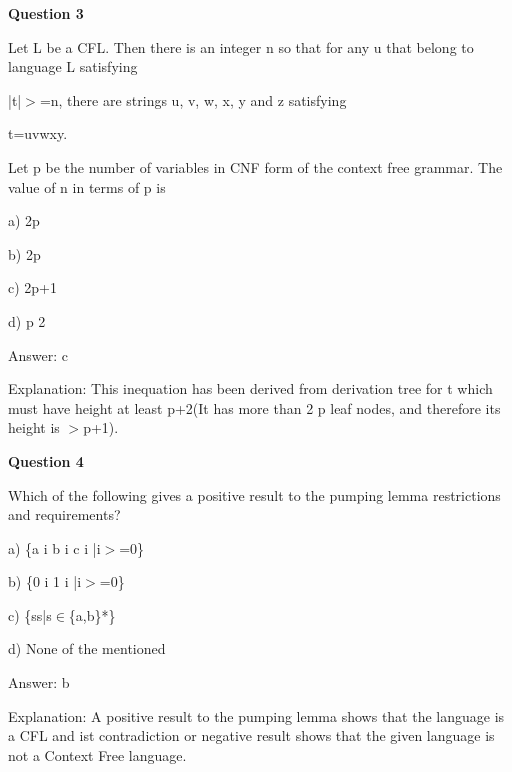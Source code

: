 \documentclass{article}
\begin{document}
\begin{mdframed}[linewidth=1pt, roundcorner=5pt, linecolor=gray!30, backgroundcolor=gray!5]
\textbf{Question 3} 

Let L be a CFL. Then there is an integer n so that for any u that belong to language L satisfying

|t|$>$=n, there are strings u, v, w, x, y and z satisfying

t=uvwxy.

Let p be the number of variables in CNF form of the context free grammar. The value of n in terms of p is

a) 2p

b) 2p

c) 2p+1

d) p
2
\vspace{5pt} \par
\begin{tcolorbox}[colback=green!5, colframe=green!40!black, title=Solution]
Answer: c

Explanation: This inequation has been derived from derivation tree for t which must have height at least p+2(It has more than 2
p
 leaf nodes, and therefore its height is $>$p+1).
\end{tcolorbox}
\end{mdframed}
\newpage

\begin{mdframed}[linewidth=1pt, roundcorner=5pt, linecolor=gray!30, backgroundcolor=gray!5]
\textbf{Question 4} 

Which of the following gives a positive result to the pumping lemma restrictions and requirements?

a) \{a
i
b
i
c
i
|i$>$=0\}

b) \{0
i
1
i
|i$>$=0\}

c) \{ss|s$\in$\{a,b\}*\}

d) None of the mentioned
\vspace{5pt} \par
\begin{tcolorbox}[colback=green!5, colframe=green!40!black, title=Solution]
Answer: b

Explanation: A positive result to the pumping lemma shows that the language is a CFL and ist contradiction or negative result shows that the given language is not a Context Free language.
\end{tcolorbox}
\end{mdframed}
\end{document}
